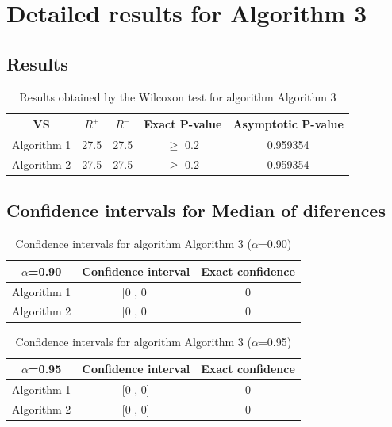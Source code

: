 \documentclass[a4paper,10pt]{article}
\begin{document}
 \clearpage 


\section{Detailed results for Algorithm 3}


\subsection{Results}

\begin{table}[!htp]
\centering\small
\begin{tabular}{
|c|c|c|c|c|}
\hline
 VS & $R^{+}$ & $R^{-}$ & Exact P-value & Asymptotic P-value \\ \hline 
Algorithm 1 & 27.5 & 27.5 & $\geq$ 0.2 & 0.959354\\ \hline 
Algorithm 2 & 27.5 & 27.5 & $\geq$ 0.2 & 0.959354\\ \hline 

\end{tabular}
\caption{Results obtained by the Wilcoxon test for algorithm Algorithm 3}
\end{table}

\subsection{Confidence intervals for Median of diferences}

\begin{table}[!htp]
\centering\small
\begin{tabular}{
|c|c|c|}
\hline
 $\alpha$=0.90 & Confidence interval & Exact confidence \\ \hline 
Algorithm 1 & [0 , 0] & 0\\ \hline 
Algorithm 2 & [0 , 0] & 0\\ \hline 

\end{tabular}
\caption{Confidence intervals for algorithm Algorithm 3 ($\alpha$=0.90)}
\end{table}
\begin{table}[!htp]
\centering\small
\begin{tabular}{
|c|c|c|}
\hline
 $\alpha$=0.95 & Confidence interval & Exact confidence \\ \hline 
Algorithm 1 & [0 , 0] & 0\\ \hline 
Algorithm 2 & [0 , 0] & 0\\ \hline 

\end{tabular}
\caption{Confidence intervals for algorithm Algorithm 3 ($\alpha$=0.95)}
\end{table}

 \clearpage 
\end{document}
